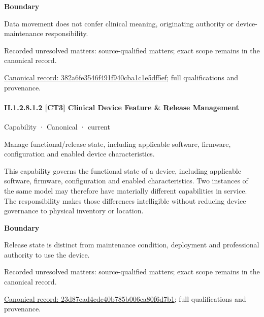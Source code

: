 \textbf{Boundary}



Data movement does not confer clinical meaning, originating authority or device-maintenance responsibility.


{\small Recorded unresolved matters: source-qualified matters; exact scope remains in the canonical record.}\par
{\footnotesize \href{../../../../continuum/strategy/capability/382a6fe3546f491f940cba1c1e5df5ef.md}{Canonical record: 382a6fe3546f491f940cba1c1e5df5ef}; full qualifications and provenance.}\par
\paragraph*{II.1.2.8.1.2 [CT3] Clinical Device Feature \& Release Management}
\label{navigation:II.1.2.8.1.2}

\label{element:23d87ead4cdc40b785b006ca80f6d7b1}
{\small Capability · Canonical · current}\par

Manage functional/release state, including applicable software, firmware, configuration and enabled device characteristics.



This capability governs the functional state of a device, including applicable software, firmware, configuration and enabled characteristics. Two instances of the same model may therefore have materially different capabilities in service. The responsibility makes those differences intelligible without reducing device governance to physical inventory or location.



\textbf{Boundary}



Release state is distinct from maintenance condition, deployment and professional authority to use the device.


{\small Recorded unresolved matters: source-qualified matters; exact scope remains in the canonical record.}\par
{\footnotesize \href{../../../../continuum/strategy/capability/23d87ead4cdc40b785b006ca80f6d7b1.md}{Canonical record: 23d87ead4cdc40b785b006ca80f6d7b1}; full qualifications and provenance.}\par
